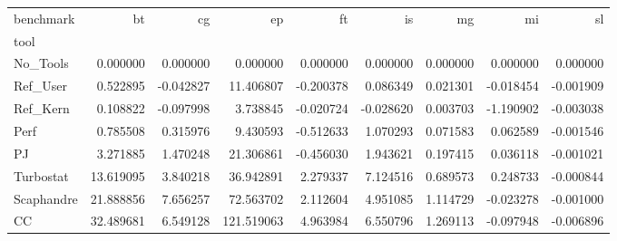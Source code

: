 \begin{tabular}{lrrrrrrrr}
\toprule
benchmark & bt & cg & ep & ft & is & mg & mi & sl \\
tool &  &  &  &  &  &  &  &  \\
\midrule
No_Tools & 0.000000 & 0.000000 & 0.000000 & 0.000000 & 0.000000 & 0.000000 & 0.000000 & 0.000000 \\
Ref_User & 0.522895 & -0.042827 & 11.406807 & -0.200378 & 0.086349 & 0.021301 & -0.018454 & -0.001909 \\
Ref_Kern & 0.108822 & -0.097998 & 3.738845 & -0.020724 & -0.028620 & 0.003703 & -1.190902 & -0.003038 \\
Perf & 0.785508 & 0.315976 & 9.430593 & -0.512633 & 1.070293 & 0.071583 & 0.062589 & -0.001546 \\
PJ & 3.271885 & 1.470248 & 21.306861 & -0.456030 & 1.943621 & 0.197415 & 0.036118 & -0.001021 \\
Turbostat & 13.619095 & 3.840218 & 36.942891 & 2.279337 & 7.124516 & 0.689573 & 0.248733 & -0.000844 \\
Scaphandre & 21.888856 & 7.656257 & 72.563702 & 2.112604 & 4.951085 & 1.114729 & -0.023278 & -0.001000 \\
CC & 32.489681 & 6.549128 & 121.519063 & 4.963984 & 6.550796 & 1.269113 & -0.097948 & -0.006896 \\
\bottomrule
\end{tabular}
